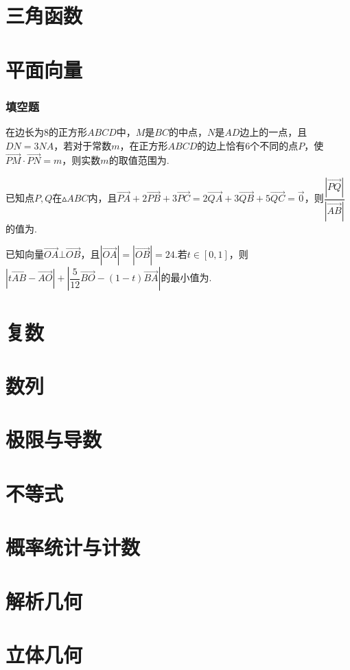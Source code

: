 \documentclass[cn,hazy,black,10pt,normal]{elegantnote}
\newcommand{\tk}{\uline{\hspace{4em}}}
\newcommand{\xl}[1]{\overrightarrow{#1}}
\begin{document}
\chapter{三角函数}

\chapter{平面向量}

\subsection*{填空题}

\begin{problem} %
	在边长为$8$的正方形$ABCD$中，$M$是$BC$的中点，$N$是$AD$边上的一点，且$DN=3NA$，若对于常数$m$，在正方形$ABCD$的边上恰有$6$个不同的点$P$，使$\xl{PM} \cdot \xl{PN} = m$，则实数$m$的取值范围为\tk .
\end{problem}

\begin{problem} %
	已知点$P,Q$在$\vartriangle ABC$内，且$\xl{PA}+2\xl{PB}+3\xl{PC}=2\xl{QA}+3\xl{QB}+5\xl{QC}=\xl{0}$，则$\dfrac{|\xl{PQ}|}{|\xl{AB}|}$的值为\tk .
\end{problem}

\begin{problem} %
	已知向量$\xl{OA} \bot \xl{OB}$，且$|\xl{OA}|=|\xl{OB}|=24$.若$t \in [0,1]$，则$|t\xl{AB}-\xl{AO}| + |\dfrac{5}{12} \xl{BO} - (1-t)\xl{BA}|$的最小值为\tk .
\end{problem}



\chapter{复数}

\chapter{数列}

\chapter{极限与导数}

\chapter{不等式}

\chapter{概率统计与计数}

\chapter{解析几何}

\chapter{立体几何}
\end{document}
